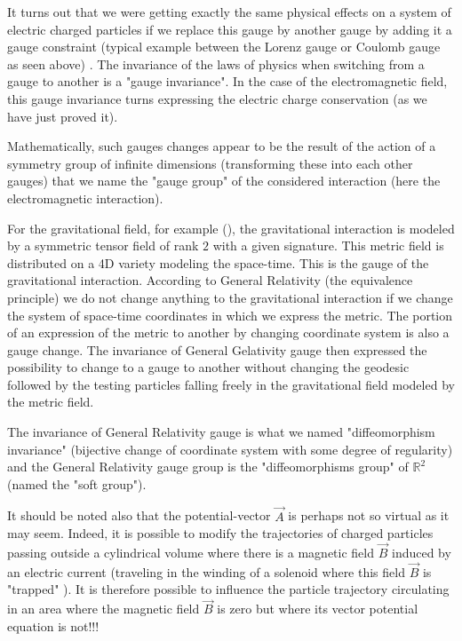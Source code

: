 	It turns out that we were getting exactly the same physical effects on a system of electric charged particles if we replace this gauge by another gauge by adding it a gauge  constraint (typical example between the Lorenz gauge or Coulomb gauge as seen above) . The invariance of the laws of physics when switching from a gauge to another is a "gauge invariance". In the case of the electromagnetic field, this gauge invariance turns expressing the electric charge conservation (as we have just proved it).

	Mathematically, such gauges changes appear to be the result of the action of a symmetry group of infinite dimensions (transforming these into each other gauges) that we name the "gauge group" of the considered interaction  (here the electromagnetic interaction).

	For the gravitational field, for example (), the gravitational interaction is modeled by a symmetric tensor field of rank $2$ with a given signature. This metric field is distributed on a 4D variety  modeling the space-time. This is the gauge of the gravitational interaction. According to General Relativity (the equivalence principle) we do not change anything to the gravitational interaction if we change the system of space-time coordinates in which we express the metric. The portion of an expression of the metric to another by changing coordinate system is also a gauge change. The invariance of General Gelativity gauge then expressed the possibility to change to a gauge to another without changing the geodesic followed by the testing particles falling freely in the gravitational field modeled by the metric field.

	The invariance of General Relativity gauge is what we named "diffeomorphism invariance" (bijective change of coordinate system with some degree of regularity) and the General Relativity gauge group is the "diffeomorphisms group" of $\mathbb{R}^2$ (named the "soft group").

	It should be noted also that the potential-vector $\vec{A}$ is perhaps not so virtual as it may seem. Indeed, it is possible to modify the trajectories of charged particles passing outside a cylindrical volume where there is a magnetic field $\vec{B}$ induced by an electric current (traveling in the winding of a solenoid where this field $\vec{B}$ is "trapped" ). It is therefore possible to influence the particle trajectory circulating in an area where the magnetic field $\vec{B}$ is zero but where its vector potential equation is not!!!

